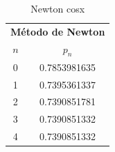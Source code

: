 \begin{table}
\centering
    \begin{tabular}{||c c||}
    \hline 
    \hline
        \multicolumn{2}{c}{\textbf{Método de Newton}}\tabularnewline
        $n$ & $p_n$      \\
    \hline 
    \hline 
        0 & 0.7853981635 \\
        1 & 0.7395361337 \\
        2 & 0.7390851781 \\
        3 & 0.7390851332 \\
        4 & 0.7390851332 \\
        \hline
        \hline 
    \end{tabular}
\caption{Newton cosx}
\label{tab:tabla5}
\end{table}
